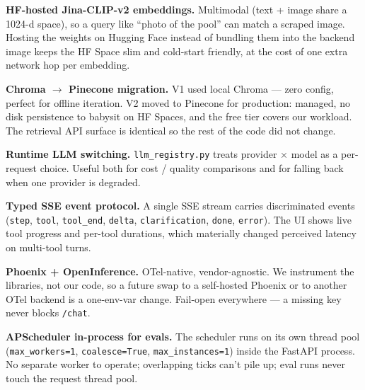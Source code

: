 \documentclass[11pt,a4paper]{article}
\begin{document}
\begin{designbox}
\textbf{HF-hosted Jina-CLIP-v2 embeddings.} Multimodal (text + image share a 1024-d
space), so a query like ``photo of the pool'' can match a scraped image. Hosting the
weights on Hugging Face instead of bundling them into the backend image keeps the HF
Space slim and cold-start friendly, at the cost of one extra network hop per embedding.
\end{designbox}

\begin{designbox}
\textbf{Chroma $\rightarrow$ Pinecone migration.} V1 used local Chroma --- zero config,
perfect for offline iteration. V2 moved to Pinecone for production: managed, no disk
persistence to babysit on HF Spaces, and the free tier covers our workload. The retrieval
API surface is identical so the rest of the code did not change.
\end{designbox}

\begin{designbox}
\textbf{Runtime LLM switching.} \texttt{llm\_registry.py} treats provider $\times$ model
as a per-request choice. Useful both for cost / quality comparisons and for falling back
when one provider is degraded.
\end{designbox}

\begin{designbox}
\textbf{Typed SSE event protocol.} A single SSE stream carries discriminated events
(\texttt{step}, \texttt{tool}, \texttt{tool\_end}, \texttt{delta}, \texttt{clarification},
\texttt{done}, \texttt{error}). The UI shows live tool progress and per-tool durations,
which materially changed perceived latency on multi-tool turns.
\end{designbox}

\begin{designbox}
\textbf{Phoenix + OpenInference.} OTel-native, vendor-agnostic. We instrument the
libraries, not our code, so a future swap to a self-hosted Phoenix or to another OTel
backend is a one-env-var change. Fail-open everywhere --- a missing key never blocks
\texttt{/chat}.
\end{designbox}

\begin{designbox}
\textbf{APScheduler in-process for evals.} The scheduler runs on its own thread pool
(\texttt{max\_workers=1}, \texttt{coalesce=True}, \texttt{max\_instances=1}) inside the
FastAPI process. No separate worker to operate; overlapping ticks can't pile up; eval
runs never touch the request thread pool.
\end{designbox}
\end{document}
